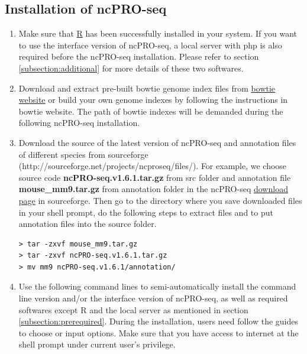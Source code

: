 \documentclass[12pt]{article}
\def \ncpip{ncPRO-seq}
\begin{document}
\noindent
\subsection{Installation of \ncpip{}}
\begin{enumerate}
 \item Make sure that \href{http://www.r-project.org/}{ R} has been successfully installed in your system. If you want to use the interface version of \ncpip{}, a local server with php is also required before the \ncpip{} installation. Please refer to section \ref{subsection:additional} for more details of these two softwares.
 \item Download and extract pre-built bowtie genome index files from \href{ftp://ftp.cbcb.umd.edu/pub/data/bowtie_indexes/}{ bowtie website} or build your own genome indexes by following the instructions in bowtie website. The path of bowtie indexes will be demanded during the following \ncpip{} installation.
 \item Download the source of the latest version of \ncpip{} and annotation files of different species from sourceforge (http://sourceforge.net/projects/ncproseq/files/). For example, we choose source code \textbf{ncPRO-seq.v1.6.1.tar.gz} from src folder and annotation file \textbf{mouse\_mm9.tar.gz} from annotation folder in the \ncpip{} \href{http://sourceforge.net/projects/ncproseq/files/}{ download page} in sourceforge. Then go to the directory where you save downloaded files in your shell prompt, do the following steps to extract files and to put annotation files into the source folder.\\
\begin{verbatim}
> tar -zxvf mouse_mm9.tar.gz
> tar -zxvf ncPRO-seq.v1.6.1.tar.gz
> mv mm9 ncPRO-seq.v1.6.1/annotation/
\end{verbatim}
 \item Use the following command lines to semi-automatically install the command line version and/or the interface version of \ncpip{}, as well as required softwares except R and the local server as mentioned in section \ref{subsection:prerequired}. During the installation, users need follow the guides to choose or input options. Make sure that you have access to internet at the shell prompt under current user's privilege.


\end{enumerate}
\end{document}
